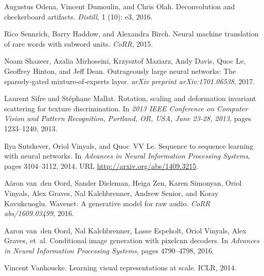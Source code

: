 \documentclass{article}
\begin{document}
\begin{thebibliography}{24}
Augustus Odena, Vincent Dumoulin, and Chris Olah.
\newblock Deconvolution and checkerboard artifacts.
\newblock \emph{Distill}, 1 (10): e3, 2016.

Rico Sennrich, Barry Haddow, and Alexandra Birch.
\newblock Neural machine translation of rare words with subword units.
\newblock \emph{CoRR}, 2015.

Noam Shazeer, Azalia Mirhoseini, Krzysztof Maziarz, Andy Davis, Quoc Le,
  Geoffrey Hinton, and Jeff Dean.
\newblock Outrageously large neural networks: The sparsely-gated
  mixture-of-experts layer.
\newblock \emph{arXiv preprint arXiv:1701.06538}, 2017.

Laurent Sifre and St{\'{e}}phane Mallat.
\newblock Rotation, scaling and deformation invariant scattering for texture
  discrimination.
\newblock In \emph{2013 {IEEE} Conference on Computer Vision and Pattern
  Recognition, Portland, OR, USA, June 23-28, 2013}, pages 1233--1240, 2013.

Ilya Sutskever, Oriol Vinyals, and Quoc~VV Le.
\newblock Sequence to sequence learning with neural networks.
\newblock In \emph{Advances in Neural Information Processing Systems}, pages
  3104--3112, 2014.
\newblock URL \url{http://arxiv.org/abs/1409.3215}.

A{\"a}ron van~den Oord, Sander Dieleman, Heiga Zen, Karen Simonyan, Oriol
  Vinyals, Alex Graves, Nal Kalchbrenner, Andrew Senior, and Koray Kavukcuoglu.
\newblock Wavenet: A generative model for raw audio.
\newblock \emph{CoRR abs/1609.03499}, 2016{}.

Aaron van~den Oord, Nal Kalchbrenner, Lasse Espeholt, Oriol Vinyals, Alex
  Graves, et~al.
\newblock Conditional image generation with pixelcnn decoders.
\newblock In \emph{Advances in Neural Information Processing Systems}, pages
  4790--4798, 2016{}.

Vincent Vanhoucke.
\newblock Learning visual representations at scale.
\newblock ICLR, 2014.


\end{thebibliography}
\end{document}
